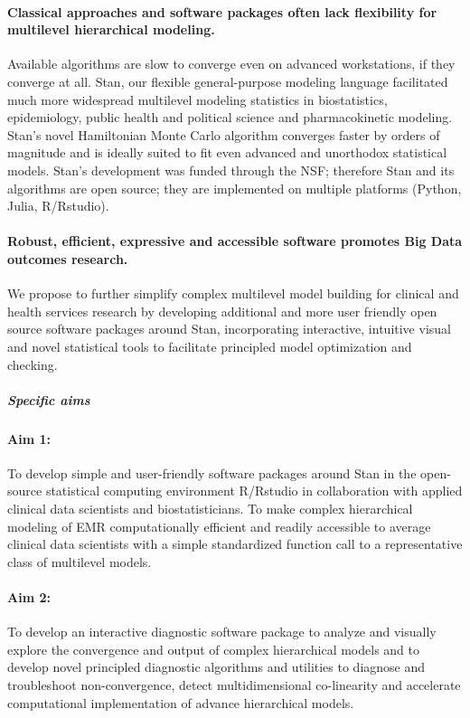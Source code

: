 \documentclass[11pt,notitlepage]{article}
\begin{document}
\paragraph*{Classical approaches and software packages often lack flexibility for multilevel hierarchical modeling.} Available algorithms are slow to converge even on advanced workstations, if they converge at all. Stan, our flexible general-purpose modeling language facilitated much more widespread multilevel modeling statistics in biostatistics, epidemiology, public health and political science and pharmacokinetic modeling. Stan's novel Hamiltonian Monte Carlo algorithm converges faster by orders of magnitude and is ideally suited to fit even advanced and unorthodox statistical models. Stan's development was funded through the NSF; therefore Stan and its algorithms are open source; they are implemented on multiple platforms (Python, Julia, R/Rstudio). 

\paragraph*{Robust, efficient, expressive and accessible software promotes Big Data outcomes research.} We propose to further simplify complex multilevel model building for clinical and health services research by developing additional and more user friendly open source software packages around Stan, incorporating interactive, intuitive visual and novel statistical tools to facilitate principled model optimization and checking. 

\subparagraph{Specific aims}
\paragraph*{Aim 1:} To develop simple and user-friendly software packages around Stan in the open-source statistical computing environment R/Rstudio in collaboration with applied clinical data scientists and biostatisticians. To make complex hierarchical modeling of EMR computationally efficient and readily accessible to average clinical data scientists with a simple standardized function call to a representative class of multilevel models.

\paragraph*{Aim 2:} To develop an interactive diagnostic software package to analyze and visually explore the convergence and output of complex hierarchical models and to develop novel principled diagnostic algorithms and utilities to diagnose and troubleshoot non-convergence, detect multidimensional co-linearity and accelerate computational implementation of advance hierarchical models.
\end{document}
